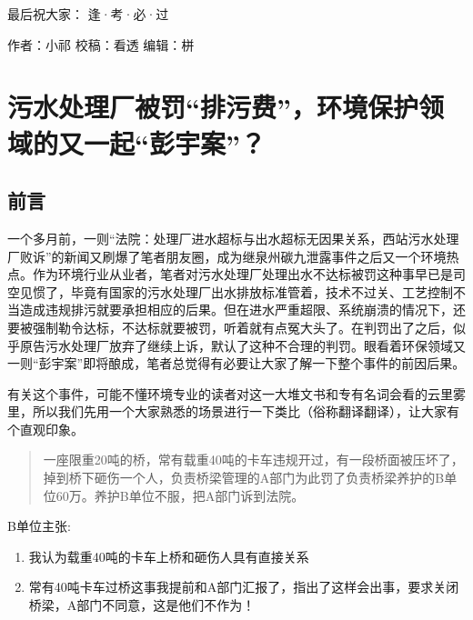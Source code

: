 \documentclass[
]{book}
\begin{document}
最后祝大家： 逢·考·必·过

作者：小祁
校稿：看透
编辑：栟

\hypertarget{ux6c61ux6c34ux5904ux7406ux5382ux88abux7f5aux6392ux6c61ux8d39ux73afux5883ux4fddux62a4ux9886ux57dfux7684ux53c8ux4e00ux8d77ux5f6dux5b87ux6848}{%
\section{污水处理厂被罚``排污费''，环境保护领域的又一起``彭宇案''？}\label{ux6c61ux6c34ux5904ux7406ux5382ux88abux7f5aux6392ux6c61ux8d39ux73afux5883ux4fddux62a4ux9886ux57dfux7684ux53c8ux4e00ux8d77ux5f6dux5b87ux6848}}

\hypertarget{ux524dux8a00-7}{%
\subsection{前言}\label{ux524dux8a00-7}}

一个多月前，一则``法院：处理厂进水超标与出水超标无因果关系，西站污水处理厂败诉''的新闻又刷爆了笔者朋友圈，成为继泉州碳九泄露事件之后又一个环境热点。作为环境行业从业者，笔者对污水处理厂处理出水不达标被罚这种事早已是司空见惯了，毕竟有国家的污水处理厂出水排放标准管着，技术不过关、工艺控制不当造成违规排污就要承担相应的后果。但在进水严重超限、系统崩溃的情况下，还要被强制勒令达标，不达标就要被罚，听着就有点冤大头了。在判罚出了之后，似乎原告污水处理厂放弃了继续上诉，默认了这种不合理的判罚。眼看着环保领域又一则``彭宇案''即将酿成，笔者总觉得有必要让大家了解一下整个事件的前因后果。

有关这个事件，可能不懂环境专业的读者对这一大堆文书和专有名词会看的云里雾里，所以我们先用一个大家熟悉的场景进行一下类比（俗称翻译翻译），让大家有个直观印象。

\begin{quote}
一座限重20吨的桥，常有载重40吨的卡车违规开过，有一段桥面被压坏了，掉到桥下砸伤一个人，负责桥梁管理的A部门为此罚了负责桥梁养护的B单位60万。养护B单位不服，把A部门诉到法院。
\end{quote}

B单位主张:

\begin{enumerate}
\def\labelenumi{\arabic{enumi}.}
\item
  我认为载重40吨的卡车上桥和砸伤人具有直接关系
\item
  常有40吨卡车过桥这事我提前和A部门汇报了，指出了这样会出事，要求关闭桥梁，A部门不同意，这是他们不作为！
\end{enumerate}
\end{document}
